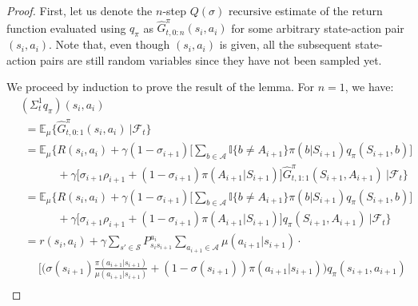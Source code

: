 \begin{proof}
First, let us denote the $n$-step  $Q(\sigma)$ recursive estimate of the return function evaluated using $q_\pi$ as $\hat{G}^{\pi}_{t, 0:n}(s_i, a_i)$ for some arbitrary state-action pair $(s_i, a_i)$.
Note that, even though $(s_i, a_i)$ is given, all the subsequent state-action pairs are still random variables since they have not been sampled yet.

We proceed by induction to prove the result of the lemma. 
For $n = 1$, we have:
\begin{align*}
& (\Sigma^1_t q_\pi)(s_i, a_i) \nonumber \\ 
	& \hspace{5pt} = \mathbb{E}_\mu \Big\{ \hat{G}^{\pi}_{t, 0:1}(s_i, a_i) \ \big|
    	\mathcal{F}_t \Big\} \nonumber \\
	& \hspace{5pt} = \mathbb{E}_\mu \Big\{R(s_i, a_i)
    	+ \gamma ( 1-\sigma_{i+1} ) \Big[\sum_{b \in \mathcal{A}} 
    	\mathbb{I}\{b \neq A_{i+1} \} \pi(b| S_{i+1}) q_\pi(S_{i+1}, b) \Big]  
        \nonumber \\
    & \hspace{40pt} 
    	+ \gamma\Big[ \sigma_{i+1} \rho_{i+1}
        + (1-\sigma_{i+1} ) \pi(A_{i+1}| S_{i+1}) \Big]
    	\hat{G}^{\pi}_{t, 1:1}(S_{i+1}, A_{i+1}) \ \big| \mathcal{F}_t \Big\} 
        \nonumber \\
    & \hspace{5pt} = \mathbb{E}_\mu \Big\{R(s_i, a_i)
    	+ \gamma (1-\sigma_{i+1} ) \Big[ \sum_{b \in \mathcal{A}} 
    	\mathbb{I}\{b \neq A_{i+1} \} \pi(b| S_{i+1}) q_\pi(S_{i+1}, b) \Big] 
        \nonumber \\
    & \hspace{40pt} 
        + \gamma \Big[ \sigma_{i+1} \rho_{i+1}
    	+ (1-\sigma_{i+1} ) \pi(A_{i+1}| S_{i+1}) \Big]
   		q_\pi(S_{i+1}, A_{i+1}) \ \big| \mathcal{F}_t \Big\} 
        \nonumber \\ 
    & \hspace{5pt} = r(s_i, a_i)  + \gamma \sum_{s' \in \mathcal{S}} P^{a_i}_{s_i s_{i+1}} 
    	\sum_{a_{i+1} \in \mathcal{A}} \mu(a_{i+1}| s_{i+1}) \cdot
    	\nonumber \\
    & \hspace{20pt} \Big[ \Big( \sigma(s_{i+1}) 
    	\frac{\pi(a_{i+1}| s_{i+1})}{\mu(a_{i+1}|s_{i+1})} 
        + (1-\sigma(s_{i+1})) \pi(a_{i+1}| s_{i+1}) \Big) q_\pi(s_{i+1}, a_{i+1}) 
        \nonumber \\

\end{align*}
\end{proof}
